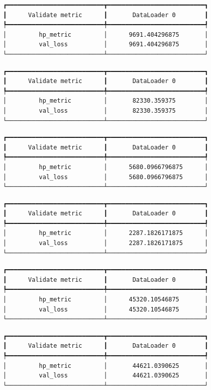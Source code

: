 \documentclass[
  letterpaper,
  DIV=11,
  numbers=noendperiod]{scrreprt}
\begin{document}
\begin{verbatim}
┏━━━━━━━━━━━━━━━━━━━━━━━━━━━┳━━━━━━━━━━━━━━━━━━━━━━━━━━━┓
┃      Validate metric      ┃       DataLoader 0        ┃
┡━━━━━━━━━━━━━━━━━━━━━━━━━━━╇━━━━━━━━━━━━━━━━━━━━━━━━━━━┩
│         hp_metric         │      9691.404296875       │
│         val_loss          │      9691.404296875       │
└───────────────────────────┴───────────────────────────┘
\end{verbatim}

\begin{verbatim}
┏━━━━━━━━━━━━━━━━━━━━━━━━━━━┳━━━━━━━━━━━━━━━━━━━━━━━━━━━┓
┃      Validate metric      ┃       DataLoader 0        ┃
┡━━━━━━━━━━━━━━━━━━━━━━━━━━━╇━━━━━━━━━━━━━━━━━━━━━━━━━━━┩
│         hp_metric         │       82330.359375        │
│         val_loss          │       82330.359375        │
└───────────────────────────┴───────────────────────────┘
\end{verbatim}

\begin{verbatim}
┏━━━━━━━━━━━━━━━━━━━━━━━━━━━┳━━━━━━━━━━━━━━━━━━━━━━━━━━━┓
┃      Validate metric      ┃       DataLoader 0        ┃
┡━━━━━━━━━━━━━━━━━━━━━━━━━━━╇━━━━━━━━━━━━━━━━━━━━━━━━━━━┩
│         hp_metric         │      5680.0966796875      │
│         val_loss          │      5680.0966796875      │
└───────────────────────────┴───────────────────────────┘
\end{verbatim}

\begin{verbatim}
┏━━━━━━━━━━━━━━━━━━━━━━━━━━━┳━━━━━━━━━━━━━━━━━━━━━━━━━━━┓
┃      Validate metric      ┃       DataLoader 0        ┃
┡━━━━━━━━━━━━━━━━━━━━━━━━━━━╇━━━━━━━━━━━━━━━━━━━━━━━━━━━┩
│         hp_metric         │      2287.1826171875      │
│         val_loss          │      2287.1826171875      │
└───────────────────────────┴───────────────────────────┘
\end{verbatim}

\begin{verbatim}
┏━━━━━━━━━━━━━━━━━━━━━━━━━━━┳━━━━━━━━━━━━━━━━━━━━━━━━━━━┓
┃      Validate metric      ┃       DataLoader 0        ┃
┡━━━━━━━━━━━━━━━━━━━━━━━━━━━╇━━━━━━━━━━━━━━━━━━━━━━━━━━━┩
│         hp_metric         │      45320.10546875       │
│         val_loss          │      45320.10546875       │
└───────────────────────────┴───────────────────────────┘
\end{verbatim}

\begin{verbatim}
┏━━━━━━━━━━━━━━━━━━━━━━━━━━━┳━━━━━━━━━━━━━━━━━━━━━━━━━━━┓
┃      Validate metric      ┃       DataLoader 0        ┃
┡━━━━━━━━━━━━━━━━━━━━━━━━━━━╇━━━━━━━━━━━━━━━━━━━━━━━━━━━┩
│         hp_metric         │       44621.0390625       │
│         val_loss          │       44621.0390625       │
└───────────────────────────┴───────────────────────────┘
\end{verbatim}
\end{document}
